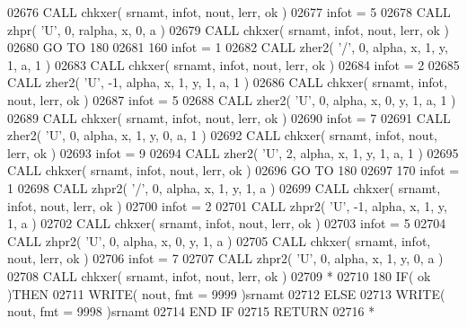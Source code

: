 \begin{DoxyCode}
02676       \textcolor{keyword}{CALL }chkxer( srnamt, infot, nout, lerr, ok )
02677       infot = 5
02678       \textcolor{keyword}{CALL }zhpr( \textcolor{stringliteral}{'U'}, 0, ralpha, x, 0, a )
02679       \textcolor{keyword}{CALL }chkxer( srnamt, infot, nout, lerr, ok )
02680       \textcolor{keywordflow}{GO TO} 180
02681   160 infot = 1
02682       \textcolor{keyword}{CALL }zher2( \textcolor{stringliteral}{'/'}, 0, alpha, x, 1, y, 1, a, 1 )
02683       \textcolor{keyword}{CALL }chkxer( srnamt, infot, nout, lerr, ok )
02684       infot = 2
02685       \textcolor{keyword}{CALL }zher2( \textcolor{stringliteral}{'U'}, -1, alpha, x, 1, y, 1, a, 1 )
02686       \textcolor{keyword}{CALL }chkxer( srnamt, infot, nout, lerr, ok )
02687       infot = 5
02688       \textcolor{keyword}{CALL }zher2( \textcolor{stringliteral}{'U'}, 0, alpha, x, 0, y, 1, a, 1 )
02689       \textcolor{keyword}{CALL }chkxer( srnamt, infot, nout, lerr, ok )
02690       infot = 7
02691       \textcolor{keyword}{CALL }zher2( \textcolor{stringliteral}{'U'}, 0, alpha, x, 1, y, 0, a, 1 )
02692       \textcolor{keyword}{CALL }chkxer( srnamt, infot, nout, lerr, ok )
02693       infot = 9
02694       \textcolor{keyword}{CALL }zher2( \textcolor{stringliteral}{'U'}, 2, alpha, x, 1, y, 1, a, 1 )
02695       \textcolor{keyword}{CALL }chkxer( srnamt, infot, nout, lerr, ok )
02696       \textcolor{keywordflow}{GO TO} 180
02697   170 infot = 1
02698       \textcolor{keyword}{CALL }zhpr2( \textcolor{stringliteral}{'/'}, 0, alpha, x, 1, y, 1, a )
02699       \textcolor{keyword}{CALL }chkxer( srnamt, infot, nout, lerr, ok )
02700       infot = 2
02701       \textcolor{keyword}{CALL }zhpr2( \textcolor{stringliteral}{'U'}, -1, alpha, x, 1, y, 1, a )
02702       \textcolor{keyword}{CALL }chkxer( srnamt, infot, nout, lerr, ok )
02703       infot = 5
02704       \textcolor{keyword}{CALL }zhpr2( \textcolor{stringliteral}{'U'}, 0, alpha, x, 0, y, 1, a )
02705       \textcolor{keyword}{CALL }chkxer( srnamt, infot, nout, lerr, ok )
02706       infot = 7
02707       \textcolor{keyword}{CALL }zhpr2( \textcolor{stringliteral}{'U'}, 0, alpha, x, 1, y, 0, a )
02708       \textcolor{keyword}{CALL }chkxer( srnamt, infot, nout, lerr, ok )
02709 \textcolor{comment}{*}
02710   180 \textcolor{keywordflow}{IF}( ok )\textcolor{keywordflow}{THEN}
02711          \textcolor{keyword}{WRITE}( nout, fmt = 9999 )srnamt
02712       \textcolor{keywordflow}{ELSE}
02713          \textcolor{keyword}{WRITE}( nout, fmt = 9998 )srnamt
02714 \textcolor{keywordflow}{      END IF}
02715       \textcolor{keywordflow}{RETURN}
02716 \textcolor{comment}{*}

\end{DoxyCode}
